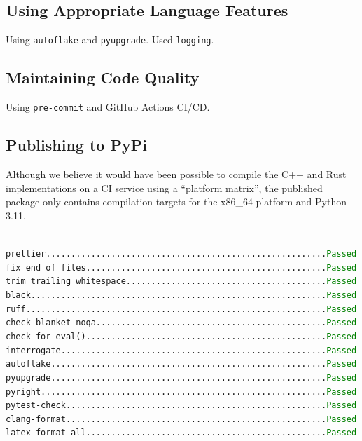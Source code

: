 \documentclass{prettytex/ox/mmsc-special-topic}
\begin{document}
  \subsection{Using Appropriate Language Features}
  Using \texttt{autoflake} and \texttt{pyupgrade}.
  Used \texttt{logging}.
  \subsection{Maintaining Code Quality}
  Using \texttt{pre-commit} and GitHub Actions CI/CD.

  \subsection{Publishing to PyPi}
  Although we believe it would have been possible to compile the C++ and Rust implementations on a CI service using a ``platform matrix'', the published package only contains compilation targets for the x86\_64 platform and Python 3.11.

  \texttt{
    \hspace*{-1em} prettier........................................................\textcolor{green}{Passed} \\
    fix end of files................................................\textcolor{green}{Passed} \\
    trim trailing whitespace........................................\textcolor{green}{Passed} \\
    black...........................................................\textcolor{green}{Passed} \\
    ruff............................................................\textcolor{green}{Passed} \\
    check blanket noqa..............................................\textcolor{green}{Passed} \\
    check for eval()................................................\textcolor{green}{Passed} \\
    interrogate.....................................................\textcolor{green}{Passed} \\
    autoflake.......................................................\textcolor{green}{Passed} \\
    pyupgrade.......................................................\textcolor{green}{Passed} \\
    pyright.........................................................\textcolor{green}{Passed} \\
    pytest-check....................................................\textcolor{green}{Passed} \\
    clang-format....................................................\textcolor{green}{Passed} \\
    latex-format-all................................................\textcolor{green}{Passed}
  }
\end{document}
